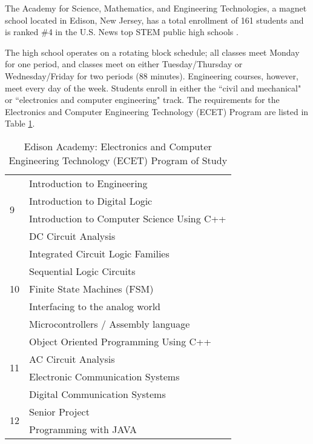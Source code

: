 The Academy for Science, Mathematics, and Engineering Technologies, a magnet school located in Edison, New Jersey, has a total enrollment of 161 students and is ranked \#4 in the U.S. News top STEM public high schools \cite{usnews}. \par
The high school operates on a rotating block schedule; all classes meet Monday for one period, and classes meet on either Tuesday/Thursday or Wednesday/Friday for two periods (88 minutes). Engineering courses, however, meet every day of the week. Students enroll in either the ``civil and mechanical" or ``electronics and computer engineering" track. The requirements for the Electronics and Computer Engineering Technology (ECET) Program are listed in Table \ref{ecet}. \par
 \begin{table}[]
 \centering
 \caption{Edison Academy: Electronics and Computer Engineering Technology (ECET) Program of Study \cite{edisonacad}}
 \label{ecet}
 \begin{tabular}{|l|l|}
 \hline
 \multirow{4}{*}{9}  & Introduction to Engineering  \\ \cline{2-2} 
                     & Introduction to Digital Logic \\ \cline{2-2} 
                     & Introduction to Computer Science Using C++  \\ \cline{2-2} 
                     & DC Circuit Analysis \\ \hline
 \multirow{5}{*}{10} & Integrated Circuit Logic Families  \\ \cline{2-2} 
                     & Sequential Logic Circuits \\ \cline{2-2} 
                     & Finite State Machines (FSM) \\ \cline{2-2} 
                     & Interfacing to the analog world \\ \cline{2-2} 
                     & Microcontrollers / Assembly language \\ \hline
 \multirow{4}{*}{11} & Object Oriented Programming Using C++  \\ \cline{2-2} 
                     & AC Circuit Analysis \\ \cline{2-2} 
                     & Electronic Communication Systems \\ \cline{2-2} 
                     & Digital Communication Systems \\ \hline
 \multirow{2}{*}{12} & Senior Project \\ \cline{2-2} 
                     & Programming with JAVA \\ \hline
 \end{tabular}
 \end{table}
